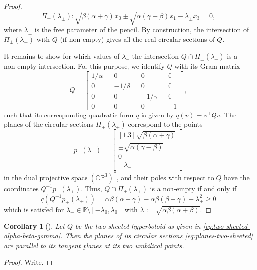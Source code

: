 \documentclass[10pt, a4paper]{article}
\theoremstyle{BoldTopSpacing}
\theoremstyle{BoldTopSpacing}
\theoremstyle{BoldTopSpacing}
\newtheorem{corollary}{Corollary}[theorem]
\theoremstyle{BoldTopBottomSpacing}
\theoremstyle{BoldTopSpacing}
\theoremstyle{BoldTopBottomSpacing}
\theoremstyle{remark}
\begin{document}
\begin{proof}
\[
    \Pi_{\pm}(\lambda_{\pm}) : \sqrt{\beta (\alpha + \gamma)} x_{0} \pm \sqrt{\alpha (\gamma - \beta)} x_{1} - \lambda_{\pm} x_{3} = 0,
\]
where $\lambda_{\pm}$ is the free parameter of the pencil. By construction, the intersection of $\Pi_{\pm}(\lambda_{\pm})$ with $Q$ (if non-empty) gives all the real circular sections of $Q$. \par
It remains to show for which values of $\lambda_{\pm}$ the intersection $Q \cap \Pi_{\pm}(\lambda_{\pm})$ is a non-empty intersection. For this purpose, we identify $Q$ with its Gram matrix
\[
Q =
\begin{bmatrix}
1 / \alpha && 0 && 0 && 0 \\
0 && -1 / \beta && 0 && 0 \\
0 && 0 && -1 / \gamma && 0 \\
0 && 0 && 0 && -1
\end{bmatrix},
\]
such that its corresponding quadratic form $q$ is given by $q(v) = v^{\top} Q v$. The planes of the circular sections $\Pi_{\pm}(\lambda_{\pm})$ correspond to the points
\[
p_{\pm}({\lambda_{\pm}}) =
\begin{bmatrix}[1.3]
\sqrt{\beta (\alpha + \gamma)}\\
\pm \sqrt{\alpha (\gamma - \beta)}\\
0\\
-\lambda_{\pm}
\end{bmatrix}
\]
in the dual projective space $(\mathbb{C}\mathbb{P}^3)^{*}$, and their poles with respect to $Q$ have the coordinates $Q^{-1}p_{\pm}({\lambda_{\pm}})$. Thus, $Q \cap \Pi_{\pm}(\lambda_{\pm})$ is a non-empty if and only if
\[
    q(Q^{-1}p_{\pm}({\lambda_{\pm}})) = \alpha \beta (\alpha + \gamma) - \alpha \beta (\beta - \gamma) - \lambda_{\pm}^2 \geq 0
\]
which is satisfed for $\lambda_{\pm} \in \mathbb{R} \setminus \left[-\lambda_0, \lambda_0\right]$ with $\lambda := \sqrt{\alpha \beta (\alpha+\beta)}$.
\end{proof}

\begin{corollary}[]
\label{col:planes-parallel-umbilic-points}
Let $Q$ be the two-sheeted hyperboloid as given in \eqref{eq:two-sheeted-alpha-beta-gamma}. Then the planes of its circular sections \eqref{eq:planes-two-sheeted} are parallel to its tangent planes at its two umbilical points.
\end{corollary}

\begin{proof}
    Write.
\end{proof}
\end{document}
